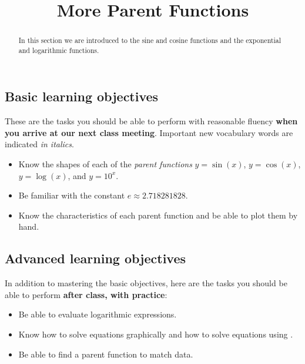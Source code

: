 \documentclass{ximera}
\title{More Parent Functions}
\begin{document}
\begin{abstract}
In this section we are introduced to the sine and cosine functions and the exponential and logarithmic functions.
\end{abstract}
\maketitle

\subsection*{Basic learning objectives}

These are the tasks you should be able to perform with reasonable fluency \textbf{when you arrive at our next class meeting}. Important new vocabulary words are indicated \emph{in italics}. 

\begin{itemize}
	\item Know the shapes of each of the \emph{parent functions} $y=\sin(x)$, $y=\cos(x)$, $y=\log(x)$, and  $y=10^x$.
	\item Be familiar with the constant $e\approx 2.718281828$.
	\item Know the characteristics of each parent function and be able to plot them by hand.
\end{itemize}

\subsection*{Advanced learning objectives}

In addition to mastering the basic objectives, here are the tasks you should be able to perform \textbf{after class, with practice}: 

\begin{itemize}
	\item Be able to evaluate logarithmic expressions.
	\item Know how to solve equations graphically and how to solve equations using .
	\item Be able to find a parent function to match data.
\end{itemize}
\end{document}
